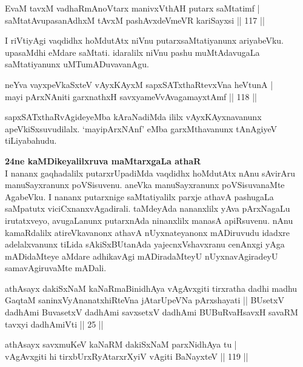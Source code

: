 \begin{shl}
EvaM tavxM vadhaRmAnoV\s tarx manivxVthAH putarx saMtatimf | \\
saMtatAvupasanAdhxM tAvxM pashAvxdeVmeVR kariSayxsi \hfill|| 117 || 
\end{shl}

\begin{artha}
I riVtiyAgi vaqdidhx hoMdutAtx niVnu putarxsaMtatiyanunx ariyabeVku. 
upasaMdhi eMdare saMtati. idaralilx niVnu pashu muMtAdavugaLa 
saMtatiyanunx uMTumADuvavanAgu.
\end{artha}


\begin{shl}
neYva vayxpeVkaSxteV vAyxKAyxM sapxSATxthaRtevxVna heVtunA | \\
mayi pArxNAniti garxnathxH savxyameVvAvagamayxtAmf \hfill|| 118 || 
\end{shl}

\begin{artha}
sapxSATxthaRvAgideyeMba kAraNadiMda ililx vAyxKAyxnavanunx 
apeVkiSxsuvudilalx. `mayipArxNAnf' eMba garxMthavanunx tAnAgiyeV
tiLiyabahudu.

\textbf{24ne kaMDikeyalilxruva maMtarxgaLa athaR}\\
I nananx gaqhadalilx putarxrUpadiMda vaqdidhx hoMdutAtx nAnu sAvirAru 
manuSayxranunx poVSisuvenu. aneVka manuSayxranunx poVSisuvanaMte 
AgabeVku. I nananx putarxnige saMtatiyalilx parxje athavA pashugaLa 
saMpatutx viciCxnanxvAgadirali. taMdeyAda nananxlilx yAva pArxNagaLu 
irutatxveyo, avugaLanunx putarxnAda ninanxlilx manasA apiRsu\-venu. 
nAnu kamaRdalilx atireVkavanonx athavA nUyxnateyanonx mADiruvudu 
idadxre adelalxvanunx tiLida sAkiSxBUtanAda yajecnxVshavxranu cenAnxgi 
yAga mADidaMte\-ye aMdare adhikavAgi mADiradaMteyU nUyxnavAgiradeyU 
samavAgiruvaMte mADali.
\end{artha}


\begin{shl}
athAsayx dakiSxNaM kaNaRmaBinidhAya vAgAvxgiti tirxratha dadhi madhu GaqtaM saninxVyAnanatxhiRteVna jAtarUpeVNa pArxshayati || BUsetxV dadhAmi BuvasetxV dadhAmi savxsetxV dadhAmi BUBuRvaHsavxH savaRM tavxyi dadhAmiVti || 25 ||
\end{shl}

\begin{shl}
athAsayx savxmuKeV kaNaRM dakiSxNaM parxNidhAya tu | \\
vAgAvxgiti hi tirxbUrxRyAtarxrXyiV vAgiti BaNayxteV \hfill|| 119 || 
\end{shl}

